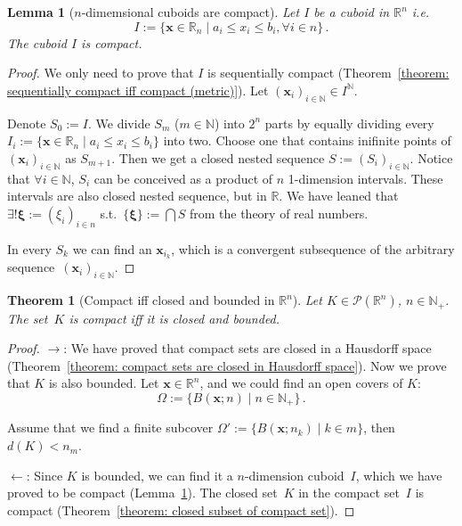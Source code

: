 \documentclass[openany]{book}
\theoremstyle{plain}
\newtheorem{theorem}{Theorem}[section] %
\newtheorem{lemma}{Lemma} %
\theoremstyle{definition}
\newcommand*{\bv}{\boldsymbol} %
\begin{document}
\begin{lemma}[$n$-dimemsional cuboids are compact]
	\label{lemma: n-dimensional cuboids are compact}
	Let $I$ be a cuboid in $\mathbb R^n$ i.e.\ 
	\begin{equation*}
		I := \{\bv x \in \mathbb R_n \mid a_i \leq x_i \leq b_i, \forall i \in n\}\,.
	\end{equation*}
	The cuboid $I$ is compact.
\end{lemma}
\begin{proof}
	We only need to prove that $I$ is sequentially compact (Theorem~\ref{theorem: sequentially compact iff compact (metric)}). 
	Let $(\bv x_i)_{i \in \mathbb N} \in I^\mathbb N$. 
	
	Denote $S_0 := I$.
	We divide $S_m$ ($m \in \mathbb N$) into $2^n$ parts by equally dividing every $I_i := \{\bv x \in \mathbb R_n \mid a_i \leq x_i \leq b_i\}$ into two. 
	Choose one that contains inifinite points of $(\bv x_i)_{i \in \mathbb N}$ as $S_{m+1}$. 
	Then we get a closed nested sequence $S := (S_i)_{i \in \mathbb N}$.
	Notice that $\forall i \in \mathbb N$, $S_i$ can be conceived as a product of $n$ 1-dimension intervals. These intervals are also closed nested sequence, but in $\mathbb R$. 
	We have leaned that $\exists! \bv \xi := (\xi_i)_{i \in n}$ s.t.\ $\{\bv \xi\} := \bigcap S$ from the theory of real numbers.

	In every $S_k$ we can find an $\bv x_{i_k}$, which is a convergent subsequence of the arbitrary sequence~$(\bv x_i)_{i \in \mathbb N}$.
\end{proof}

\begin{theorem}[Compact iff closed and bounded in $\mathbb R^n$]
	\label{theorem: compact iff closed and bounded in Rn}
	Let $K \in \mathscr P(\mathbb R^n)$, $n \in \mathbb N_+$.
	The set~$K$ is compact \emph{iff} it is closed and bounded.
\end{theorem}
\begin{proof}
	$\to$: 
	We have proved that compact sets are closed in a Hausdorff space (Theorem~\ref{theorem: compact sets are closed in Hausdorff space}). 
	Now we prove that $K$ is also bounded. 
	Let $\bv x \in \mathbb R^n$, and we could find an open covers of $K$: 
	\begin{equation*}
		\varOmega := \{B(\bv x; n) \mid n \in \mathbb N_+\}\,.
	\end{equation*}

	Assume that we find a finite subcover $\varOmega' := \{B(\bv x; n_k) \mid k \in m\}$, then $d(K) < n_m$.

	$\gets$: Since $K$ is bounded, we can find it a $n$-dimension cuboid~$I$, which we have proved to be compact (Lemma~\ref{lemma: n-dimensional cuboids are compact}). 
	The closed set~$K$ in the compact set~$I$ is compact (Theorem~\ref{theorem: closed subset of compact set}).

\end{proof}
\end{document}
